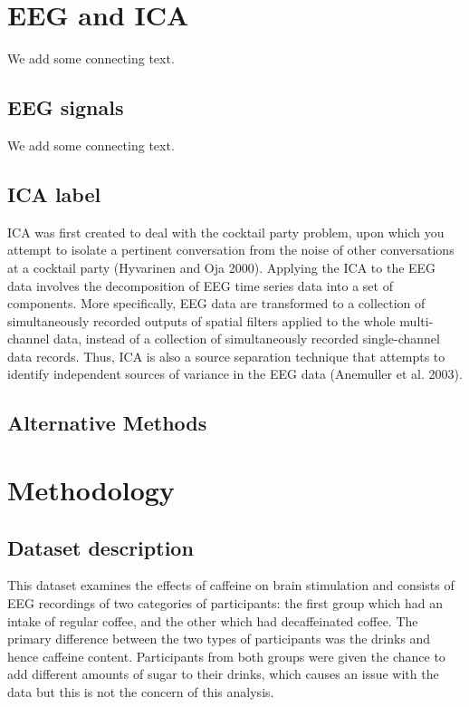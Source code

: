 \documentclass[12pt,a4paper,titlepage,openany]{report}
\begin{document}


\chapter{EEG and ICA}
\thispagestyle{fancy}

We add some connecting text.

\section{EEG signals}

We add some connecting text.

\section{ICA label}

ICA was first created to deal with the cocktail party problem, upon which you attempt to isolate a pertinent conversation from the noise of other conversations at a cocktail party (Hyvarinen and Oja 2000). 
Applying the ICA to the EEG data involves the decomposition of EEG time series data into a set of components. 
More specifically, EEG data are transformed to a collection of simultaneously recorded outputs of spatial filters applied to the whole multi-channel data, instead of a collection of simultaneously recorded single-channel data records. 
Thus, ICA is also a source separation technique that attempts to identify independent sources of variance in the EEG data (Anemuller et  al. 2003).

\section{Alternative Methods}




\chapter{Methodology}
\thispagestyle{fancy}

\section{Dataset description}

This dataset examines the effects of caffeine on brain stimulation and consists of EEG recordings of two categories of participants: the first group which had an intake of regular coffee, and the other which had decaffeinated coffee. 
The primary difference between the two types of participants was the drinks and hence caffeine content. 
Participants from both groups were given the chance to add different amounts of sugar to their drinks, which causes an issue with the data but this is not the concern of this analysis.
\end{document}
